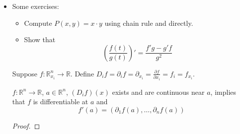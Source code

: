 \begin{itemize}
\begin{proof}
\begin{align}
\begin{pmatrix}
            \end{pmatrix} \\ 
            &= \begin{pmatrix}
                f_1'(a)\cdot h + e_1(h) \\ 
                \vdots \\ 
                f_m'(a) \cdot h + e_m(h)
            \end{pmatrix} \\ 
            &= \begin{pmatrix}
                f_1'(a) \\ \vdots \\ f_m'(a)
            \end{pmatrix}\cdot h + \begin{pmatrix}
                e_1(h) \\ \vdots \\ e_m(h)
            \end{pmatrix}
        \end{align}
        All that remains to show is that a column vector consisting of tiny functions is itself a tiny function. Finally, the other implication is easy.
    \end{proof}
    \item Some exercises: 
    \begin{itemize}
        \item Compute $P(x,y) = x\cdot y$ using chain rule and directly.
        \item Show that 
        \begin{equation}
            \left(\frac{f(t)}{g(t)}\right)' = \frac{f'g-g'f}{g^2}
        \end{equation}
    \end{itemize}
    \begin{definition}
        Suppose $f:\mathbb{R}^n_{x_i}\rightarrow \mathbb{R}.$ Define $D_if = \partial_i f = \partial_{x_i} = \frac{\partial f}{\partial x_i} = f_i = f_{x_i}.$
    \end{definition}
    \begin{theorem}
        $f:\mathbb{R}^n\rightarrow \mathbb{R}$, $a\in \mathbb{R}^n$, $(D_if)(x)$ exists and are continuous near $a$, implies that $f$ is differentiable at $a$ and 
        \begin{equation}
            f'(a) = (\partial_1 f(a), \dots, \partial_n f(a))
        \end{equation}
    \end{theorem}
    \begin{proof}

\end{proof}
\end{itemize}
